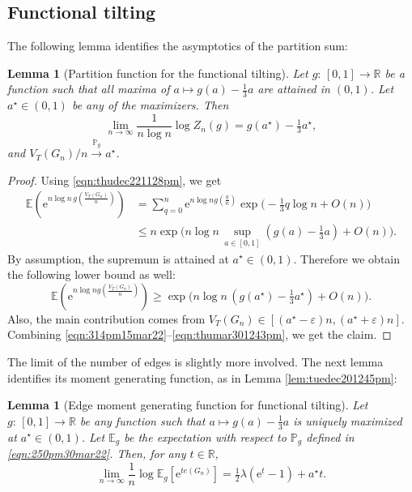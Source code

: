 \documentclass[bj,authoryear,noshowframe]{imsart}
\numberwithin{equation}{section}
\theoremstyle{plain}
\newtheorem{lem}[thm]{Lemma}
\theoremstyle{definition}
\newcommand{\sss}{\scriptscriptstyle}
\newcommand{\e}{{\mathrm e}}
\newcommand {\convpg}{\stackrel{\sss {\mathbb P}_g}{\longrightarrow}}
\begin{document}

\subsection{Functional tilting}
\label{sec:exptriangles2}
The following lemma identifies the asymptotics of the partition sum:
 
\begin{lem}[Partition function for the functional tilting]
\label{prop:thumar301259pm}
Let $g\colon\,[0,1]\rightarrow \mathbb{R}$ be a function such that all maxima of $a\mapsto g(a)-\tfrac13 a$ are attained in $(0,1)$. Let $a^\star \in (0,1)$ be any of the maximizers. Then
	\begin{equation}
	\label{universality:ergm-alt}
	\lim_{n\rightarrow \infty} \frac{1}{n\log{n}}\log{Z_n(g)} = g(a^\star)-\tfrac13 a^\star,
	\end{equation}
and $V_{ T}(G_n)/n\convpg a^\star$. 
\end{lem}

\begin{proof}
Using \eqref{eqn:thudec221128pm}, we get 
	\begin{equation}
	\label{eqn:314pm15mar22}
	\begin{aligned}
	\mathbb{E}\left(\mathrm{e}^{n\log{n}\,g(\frac{V_{ T}(G_n)}{n})}\right) 
	&= \sum_{q=0}^n \mathrm{e}^{n\log{n} g(\frac{q}{n})}\exp\big(-\tfrac13 q\log{n} +O(n)\big)\\
	&\leq n \exp\Big(n\log{n}\,\sup_{a\in [0,1]} (g(a)-\tfrac13 a) +O(n)\Big).
	\end{aligned}
	\end{equation}
By assumption, the supremum is attained at $a^\star \in(0,1)$. Therefore we obtain the following lower bound as well:
	\begin{equation}
	\label{eqn:thumar301243pm}
	\mathbb{E}\left(\mathrm{e}^{n\log{n} g(\frac{V_{ T}(G_n)}{n})}\right) 
	\geq \exp\Big(n\log{n}\,(g(a^\star)-\tfrac13 a^\star) +O(n)\Big).
	\end{equation}
Also, the main contribution comes from $V_{ T}(G_n)\in [(a^\star-\varepsilon)n, (a^\star+\varepsilon)n]$. Combining \eqref{eqn:314pm15mar22}--\eqref{eqn:thumar301243pm}, we get the claim.
\end{proof}

The limit of the number of edges is slightly more involved. The next lemma identifies its moment generating function, as in Lemma \ref{lem:tuedec201245pm}:

\begin{lem}[Edge moment generating function for functional tilting]
\label{lem-edge-MGF-functional}
Let $g\colon\,[0,1]\rightarrow \mathbb{R}$ be any function such that $a\mapsto g(a)-\tfrac13 a$ is uniquely maximized at $a^\star \in (0,1)$. Let $\mathbb{E}_g$ be the expectation with respect to $\mathbb{P}_{g}$ defined in \eqref{eqn:250pm30mar22}. Then, for any $t \in \mathbb{R}$, 
	\begin{equation}
	\lim_{n\rightarrow \infty}\frac{1}{n}\log{\mathbb{E}_g\left[\e^{te(G_n)}\right]} = \tfrac{1}{2}\lambda (\e^t-1)+a^\star t.
	\end{equation}
\end{lem}
\end{document}
